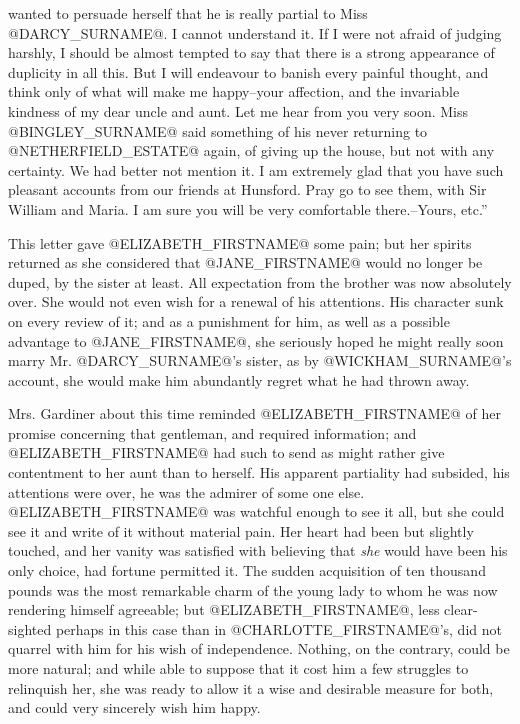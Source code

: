 wanted to persuade herself that he is really partial to Miss @DARCY_SURNAME@. I
cannot understand it. If I were not afraid of judging harshly, I should
be almost tempted to say that there is a strong appearance of duplicity
in all this. But I will endeavour to banish every painful thought,
and think only of what will make me happy--your affection, and the
invariable kindness of my dear uncle and aunt. Let me hear from you very
soon. Miss @BINGLEY_SURNAME@ said something of his never returning to @NETHERFIELD_ESTATE@
again, of giving up the house, but not with any certainty. We had better
not mention it. I am extremely glad that you have such pleasant accounts
from our friends at Hunsford. Pray go to see them, with Sir William and
Maria. I am sure you will be very comfortable there.--Yours, etc.''

This letter gave @ELIZABETH_FIRSTNAME@ some pain; but her spirits returned as she
considered that @JANE_FIRSTNAME@ would no longer be duped, by the sister at least.
All expectation from the brother was now absolutely over. She would not
even wish for a renewal of his attentions. His character sunk on
every review of it; and as a punishment for him, as well as a possible
advantage to @JANE_FIRSTNAME@, she seriously hoped he might really soon marry Mr.
@DARCY_SURNAME@'s sister, as by @WICKHAM_SURNAME@'s account, she would make him abundantly
regret what he had thrown away.

Mrs. Gardiner about this time reminded @ELIZABETH_FIRSTNAME@ of her promise
concerning that gentleman, and required information; and @ELIZABETH_FIRSTNAME@
had such to send as might rather give contentment to her aunt than to
herself. His apparent partiality had subsided, his attentions were over,
he was the admirer of some one else. @ELIZABETH_FIRSTNAME@ was watchful enough to
see it all, but she could see it and write of it without material pain.
Her heart had been but slightly touched, and her vanity was satisfied
with believing that \textit{she} would have been his only choice, had fortune
permitted it. The sudden acquisition of ten thousand pounds was the most
remarkable charm of the young lady to whom he was now rendering himself
agreeable; but @ELIZABETH_FIRSTNAME@, less clear-sighted perhaps in this case than
in @CHARLOTTE_FIRSTNAME@'s, did not quarrel with him for his wish of independence.
Nothing, on the contrary, could be more natural; and while able to
suppose that it cost him a few struggles to relinquish her, she was
ready to allow it a wise and desirable measure for both, and could very
sincerely wish him happy.

